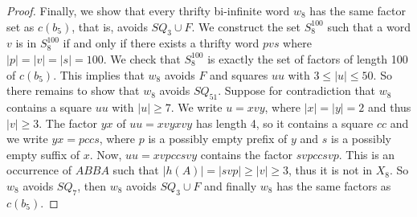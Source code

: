 \documentclass{article}
\def\paren#1{\left( #1 \right)}
\renewcommand{\le}{\leqslant}
\renewcommand{\ge}{\geqslant}
\theoremstyle{plain}
\theoremstyle{definition}
\theoremstyle{remark}
\begin{document}
\begin{proof}
Finally, we show that every thrifty bi-infinite word $w_8$ has the same factor set as $c(b_5)$, that is, avoids $SQ_3\cup F$.
We construct the set $S_8^{100}$ such that
a word $v$ is in $S_8^{100}$ if and only if there exists a thrifty word $pvs$ where $|p|=|v|=|s|=100$.
We check that $S_8^{100}$ is exactly the set of factors of length 100 of $c(b_5)$.
This implies that $w_8$ avoids $F$ and squares $uu$ with $3\le|u|\le50$.
So there remains to show that $w_8$ avoids $SQ_{51}$.
Suppose for contradiction that $w_8$ contains a square $uu$ with $|u|\ge 7$. We write $u=xvy$, where $|x|=|y|=2$ and thus $|v|\ge3$.
The factor $yx$ of $uu=xvyxvy$ has length 4, so it contains a square $cc$ and we write 
$yx=pccs$, where $p$ is a possibly empty prefix of $y$ and $s$ is a possibly empty suffix of $x$.
Now, $uu=xvpccsvy$ contains the factor $svpccsvp$.
This is an occurrence of $ABBA$ such that $|h(A)|=|svp|\ge|v|\ge3$, thus it is not in $X_8$.
So $w_8$ avoids $SQ_7$, then $w_8$ avoids $SQ_3\cup F$ and finally $w_8$ has the same factors as $c(b_5)$.



% 
% 

% 
% 


\end{proof}
\end{document}
